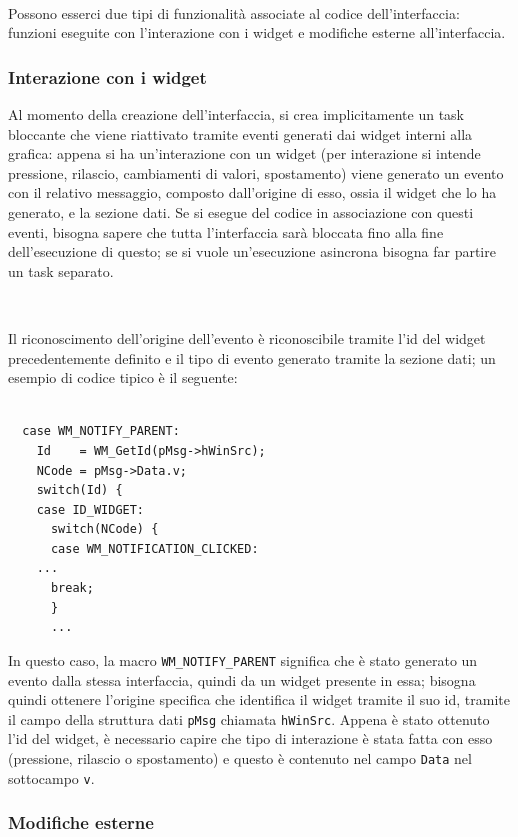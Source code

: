 \documentclass[a4paper,titlepage]{book}
\newcommand{\code}{\lstinline}
\begin{document}
~

Possono esserci due tipi di funzionalità associate al codice dell'interfaccia: funzioni eseguite con l'interazione con i widget e modifiche esterne all'interfaccia.

\subsubsection{Interazione con i widget}

Al momento della creazione dell'interfaccia, si crea implicitamente un task bloccante che viene riattivato tramite eventi generati dai widget interni alla grafica: appena si ha un'interazione con un widget (per interazione si intende pressione, rilascio, cambiamenti di valori, spostamento) viene generato un evento con il relativo messaggio, composto dall'origine di esso, ossia il widget che lo ha generato, e la sezione dati. Se si esegue del codice in associazione con questi eventi, bisogna sapere che tutta l'interfaccia sarà bloccata fino alla fine dell'esecuzione di questo; se si vuole un'esecuzione asincrona bisogna far partire un task separato.

~

Il riconoscimento dell'origine dell'evento è riconoscibile tramite l'id del widget precedentemente definito e il tipo di evento generato tramite la sezione dati; un esempio di codice tipico è il seguente:

\begin{lstlisting}

  case WM_NOTIFY_PARENT:
    Id    = WM_GetId(pMsg->hWinSrc);
    NCode = pMsg->Data.v;
    switch(Id) {
    case ID_WIDGET:
      switch(NCode) {
      case WM_NOTIFICATION_CLICKED:
	...
      break;
      }
      ...

\end{lstlisting} 

In questo caso, la macro \code!WM_NOTIFY_PARENT! significa che è stato generato un evento dalla stessa interfaccia, quindi da un widget presente in essa; bisogna quindi ottenere l'origine specifica che identifica il widget tramite il suo id, tramite il campo della struttura dati \code!pMsg! chiamata \code!hWinSrc!. Appena è stato ottenuto l'id del widget, è necessario capire che tipo di interazione è stata fatta con esso (pressione, rilascio o spostamento) e questo è contenuto nel campo \code!Data! nel sottocampo \code!v!.

\subsubsection{Modifiche esterne}
\end{document}

